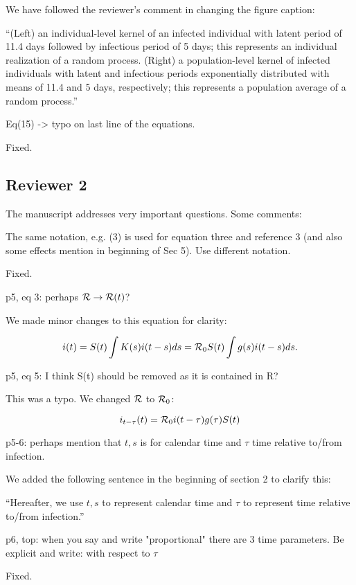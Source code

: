\documentclass[12pt]{article}
\newcommand{\RR}{\ensuremath{{\cal R}}}
\newcommand{\rev}{\subsection*}
\newcommand{\revtext}{\textsf}
\begin{document}
We have followed the reviewer's comment in changing the figure caption:

``(Left) an individual-level kernel of an infected individual with latent period of 11.4 days followed by infectious period of 5 days;
this represents an individual realization of a random process.
(Right) a population-level kernel of infected individuals with latent and infectious periods exponentially distributed with means of 11.4 and 5 days, respectively;
this represents a population average of a random process.''

\revtext{Eq(15) -> typo on last line of the equations.}

Fixed.

\rev{Reviewer 2}

\revtext{The manuscript addresses very important questions. Some comments:}

\revtext{The same notation, e.g. (3) is used for equation three and reference 3 (and also some effects mention in beginning of Sec 5). Use different notation.}

Fixed.

\revtext{p5, eq 3: perhaps $\RR \rightarrow \RR(t)$?}

We made minor changes to this equation for clarity:

\begin{equation*}
i(t) = S(t) \int K(s) i(t-s) ds = \RR_0 S(t) \int g(s) i(t-s) ds.
\end{equation*}

\revtext{p5, eq 5: I think S(t) should be removed as it is contained in R?}

This was a typo. We changed $\RR$ to $\RR_0$:

\begin{equation*}
i_{t-\tau}(t) = \RR_0 i(t-\tau) g(\tau) S(t)
\end{equation*}

\revtext{p5-6: perhaps mention that $t, s$ is for calendar time and $\tau$ time relative to/from infection.}

We added the following sentence in the beginning of section 2 to clarify this:

``Hereafter, we use $t, s$ to represent calendar time and $\tau$ to represent time relative to/from infection.''

\revtext{p6, top: when you say and write "proportional" there are 3 time parameters. Be explicit and write: with respect to $\tau$}

Fixed.
\end{document}
